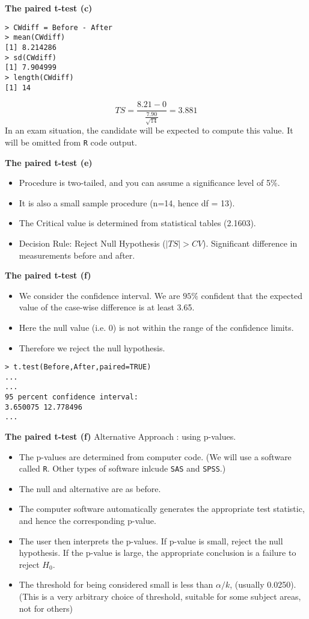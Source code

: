 \documentclass[]{report}
\begin{document}
\textbf{The paired t-test (c)}
\begin{verbatim}
> CWdiff = Before - After
> mean(CWdiff)
[1] 8.214286
> sd(CWdiff)
[1] 7.904999
> length(CWdiff)
[1] 14
\end{verbatim}

\[ TS = \frac{8.21 - 0}{\frac{7.90}{\sqrt{14}}} = 3.881 \]
In an exam situation, the candidate will be expected to compute this value. It will be omitted from \texttt{R} code output.
		
		
		\textbf{The paired t-test (e)}
		\begin{itemize}
			\item  Procedure is two-tailed, and you can assume a significance level of 5\%.
			\item  It is also a small sample procedure (n=14, hence df = 13).
			\item  The Critical value is determined from statistical tables (2.1603).
			\item  Decision Rule: Reject Null Hypothesis ($|TS|>CV$). Significant difference in measurements before and after.
		\end{itemize}
		

\textbf{The paired t-test (f)}
\begin{itemize}
	\item We consider the confidence interval. We are $95\%$ confident that the expected value of the case-wise difference is at least 3.65.
	\item Here the null value (i.e. 0) is not within the range of the confidence limits.
	\item Therefore we reject the null hypothesis.
\end{itemize}
\begin{verbatim}
> t.test(Before,After,paired=TRUE)
...
...
95 percent confidence interval:
3.650075 12.778496
...
\end{verbatim}		
		
		\textbf{The paired t-test (f)}
		Alternative Approach : using p-values.
		\begin{itemize}
			\item  The p-values are determined from computer code. (We will use a software called \texttt{R}. Other types of software inlcude \texttt{SAS} and \texttt{SPSS}.)
			\item  The null and alternative are as before.
			\item  The computer software automatically generates the appropriate test statistic, and hence the corresponding p-value.
			\item  The user then interprets the p-values. If p-value is small, reject the null hypothesis. If the p-value is large, the appropriate conclusion is a failure to reject $H_0$.
			\item  The threshold for being considered small is less than $\alpha/k$, (usually 0.0250). (This is a very arbitrary choice of threshold, suitable for some subject areas, not for others)
		\end{itemize}
		
\end{document}
